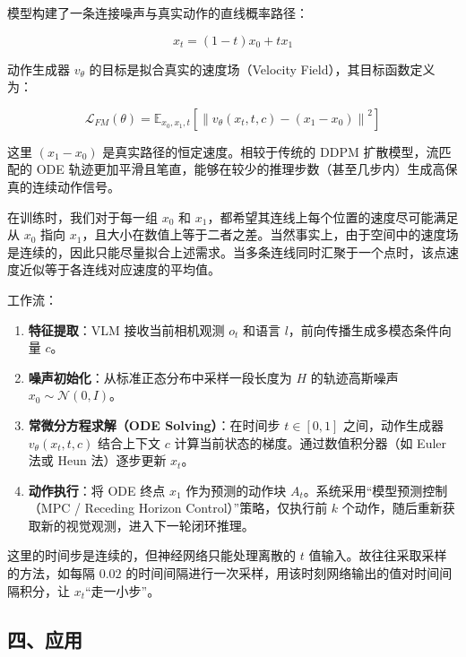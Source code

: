 模型构建了一条连接噪声与真实动作的直线概率路径：

\[
x_t=(1-t)x_0+tx_1
\]

动作生成器 \(v_\theta\) 的目标是拟合真实的速度场（Velocity Field），其目标函数定义为：

\[
\mathcal{L}_{FM}(\theta)=\mathbb{E}_{x_0,x_1,t}\left[\left\|v_\theta(x_t,t,c)-(x_1-x_0)\right\|^2\right]
\]

这里 \((x_1-x_0)\) 是真实路径的恒定速度。相较于传统的 DDPM 扩散模型，流匹配的 ODE 轨迹更加平滑且笔直，能够在较少的推理步数（甚至几步内）生成高保真的连续动作信号。

在训练时，我们对于每一组 \(x_0\) 和 \(x_1\)，都希望其连线上每个位置的速度尽可能满足从 \(x_0\) 指向 \(x_1\)，且大小在数值上等于二者之差。当然事实上，由于空间中的速度场是连续的，因此只能尽量拟合上述需求。当多条连线同时汇聚于一个点时，该点速度近似等于各连线对应速度的平均值。

工作流：

\begin{enumerate}
\def\labelenumi{\arabic{enumi}.}
\tightlist
\item
  \textbf{特征提取}：VLM 接收当前相机观测 \(o_t\) 和语言 \(l\)，前向传播生成多模态条件向量 \(c\)。
\item
  \textbf{噪声初始化}：从标准正态分布中采样一段长度为 \(H\) 的轨迹高斯噪声 \(x_0\sim\mathcal{N}(0,I)\)。
\item
  \textbf{常微分方程求解（ODE Solving）}：在时间步 \(t\in[0,1]\) 之间，动作生成器 \(v_\theta(x_t,t,c)\) 结合上下文 \(c\) 计算当前状态的梯度。通过数值积分器（如 Euler 法或 Heun 法）逐步更新 \(x_t\)。
\item
  \textbf{动作执行}：将 ODE 终点 \(x_1\) 作为预测的动作块 \(A_t\)。系统采用``模型预测控制（MPC / Receding Horizon Control）''策略，仅执行前 \(k\) 个动作，随后重新获取新的视觉观测，进入下一轮闭环推理。
\end{enumerate}

这里的时间步是连续的，但神经网络只能处理离散的 \(t\) 值输入。故往往采取采样的方法，如每隔 \(0.02\) 的时间间隔进行一次采样，用该时刻网络输出的值对时间间隔积分，让 \(x_t\)``走一小步''。

\hypertarget{ux56dbux5e94ux7528-1}{%
\subsection{四、应用}\label{ux56dbux5e94ux7528-1}}

